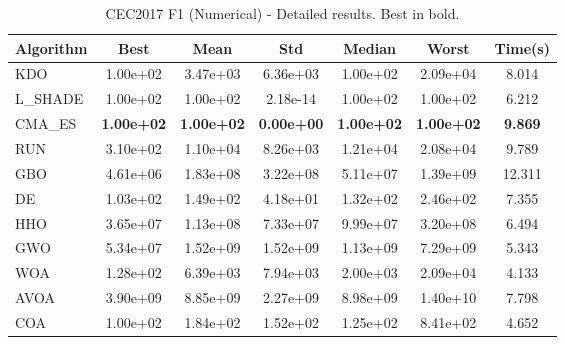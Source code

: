 \begin{table}[H]
\centering\small
\caption{CEC2017 F1 (Numerical) - Detailed results. Best in bold.}
\label{tab:cec2017_F1}
\begin{tabular}{lcccccc}
\toprule
\textbf{Algorithm} & \textbf{Best} & \textbf{Mean} & \textbf{Std} & \textbf{Median} & \textbf{Worst} & \textbf{Time(s)} \\
\midrule
KDO & 1.00e+02 & 3.47e+03 & 6.36e+03 & 1.00e+02 & 2.09e+04 & 8.014 \\
L_SHADE & 1.00e+02 & 1.00e+02 & 2.18e-14 & 1.00e+02 & 1.00e+02 & 6.212 \\
CMA_ES & \textbf{1.00e+02} & \textbf{1.00e+02} & \textbf{0.00e+00} & \textbf{1.00e+02} & \textbf{1.00e+02} & \textbf{9.869} \\
RUN & 3.10e+02 & 1.10e+04 & 8.26e+03 & 1.21e+04 & 2.08e+04 & 9.789 \\
GBO & 4.61e+06 & 1.83e+08 & 3.22e+08 & 5.11e+07 & 1.39e+09 & 12.311 \\
DE & 1.03e+02 & 1.49e+02 & 4.18e+01 & 1.32e+02 & 2.46e+02 & 7.355 \\
HHO & 3.65e+07 & 1.13e+08 & 7.33e+07 & 9.99e+07 & 3.20e+08 & 6.494 \\
GWO & 5.34e+07 & 1.52e+09 & 1.52e+09 & 1.13e+09 & 7.29e+09 & 5.343 \\
WOA & 1.28e+02 & 6.39e+03 & 7.94e+03 & 2.00e+03 & 2.09e+04 & 4.133 \\
AVOA & 3.90e+09 & 8.85e+09 & 2.27e+09 & 8.98e+09 & 1.40e+10 & 7.798 \\
COA & 1.00e+02 & 1.84e+02 & 1.52e+02 & 1.25e+02 & 8.41e+02 & 4.652 \\
\bottomrule
\end{tabular}
\end{table}
